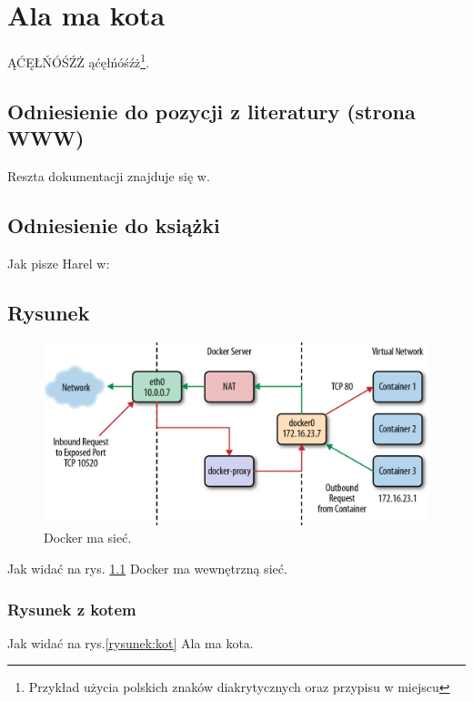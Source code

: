 \chapter{Ala ma kota}

ĄĆĘŁŃÓŚŹŻ ąćęłńóśźż\footnote{Przykład użycia polskich znaków diakrytycznych oraz przypisu w miejscu}. \lipsum[1]

\section{Odniesienie do pozycji z literatury (strona WWW)}

Reszta dokumentacji znajduje się w\cite{docker_compose_reference}. \lipsum[3]

\section{Odniesienie do książki}

Jak pisze Harel w\cite{harel_rzecz_2008}: \lipsum[7]

\section{Rysunek}

\begin{figure}
    \centering\includegraphics[width=.6\textwidth]{img/swarm-network}
    \caption{Docker ma sieć\cite{docker_compose_reference}.}  \label{rys:network}
\end{figure}

Jak widać na rys. \ref{rys:network} Docker ma wewnętrzną sieć. \lipsum[1]


\subsection{Rysunek z kotem}

Jak widać na rys.\ref{rysunek:kot} Ala ma kota. \lipsum[9-10]

